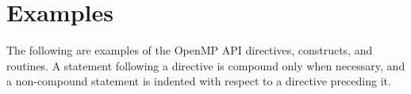 
\chapter*{Examples}
\label{chap:examples}
The following are examples of the OpenMP API directives, constructs, and routines.
\ccppspecificstart
A statement following a directive is compound only when necessary, and a 
non-compound statement is indented with respect to a directive preceding it.
\ccppspecificend


